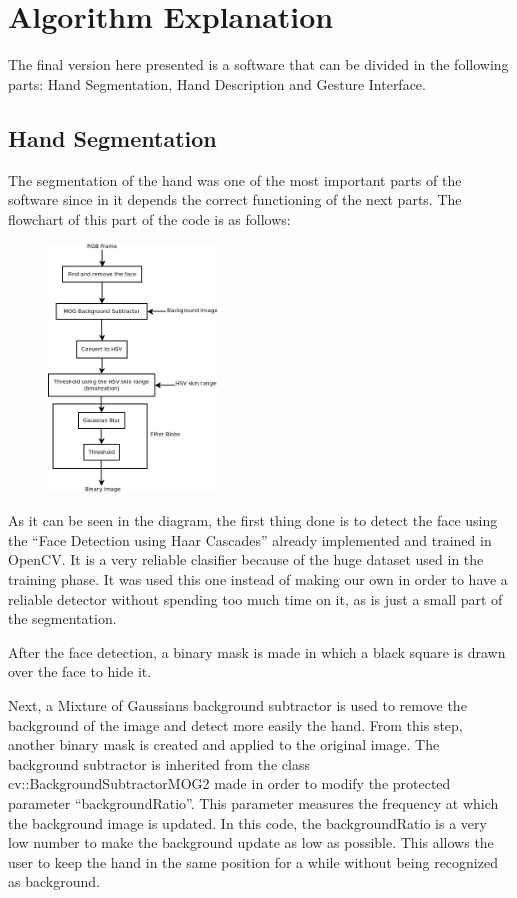 \section{Algorithm Explanation}

The final version here presented is a software that can be divided in the following parts: Hand Segmentation, Hand Description and Gesture Interface.

\subsection{Hand Segmentation}
The segmentation of the hand was one of the most important parts of the software since in it depends the correct functioning of the next parts. 
The flowchart of this part of the code is as follows: 

\begin{figure}[H]
	\centering
	 \includegraphics[width=0.4\textwidth]{../images/hand_filter.jpeg} 
\end{figure}
 
As it can be seen in the diagram, the first thing done is to detect the face using the ``Face Detection using Haar Cascades'' already implemented and trained in OpenCV. It is a very reliable clasifier because of the huge dataset used in the training phase. It was used this one instead of making our own in order to have a reliable detector without spending too much time on it, as is just a small part of the segmentation. 


After the face detection, a binary mask is made in which a black square is drawn over the face to hide it.

Next, a Mixture of Gaussians background subtractor is used to remove the background of the image and detect more easily the hand. From this step, another binary mask is created and applied to the original image. 
The background subtractor is inherited from the class cv::BackgroundSubtractorMOG2 made in order to modify the protected parameter ``backgroundRatio''. This parameter measures the frequency at which the background image is updated. In this code, the backgroundRatio is a very low number to make the background update as low as possible. This allows the user to keep the hand in the same position for a while without being recognized as background.  

